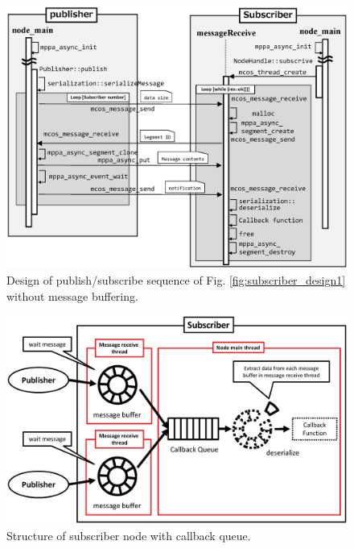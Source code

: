 \begin{figure}[thbp]
  \centering
  \includegraphics[width=0.9\linewidth]{../figure/roslite/design/pubsub_thread_design1.eps}
  \caption{\label{fig:pubsub_thread_design1}
    Design of publish/subscribe sequence of Fig. \ref{fig:subscriber_design1} without message buffering.}
    \vspace{-10mm}
\end{figure}

\vspace{-10mm}

\begin{figure}[thbp]
  \centering
  \includegraphics[width=0.9\linewidth]{../figure/roslite/design/subscriber_design2.eps}
  \vspace{-10mm}
  \caption{\label{fig:subscriber_design2}
    Structure of subscriber node with callback queue.}
    \vspace{-10mm}
\end{figure}

